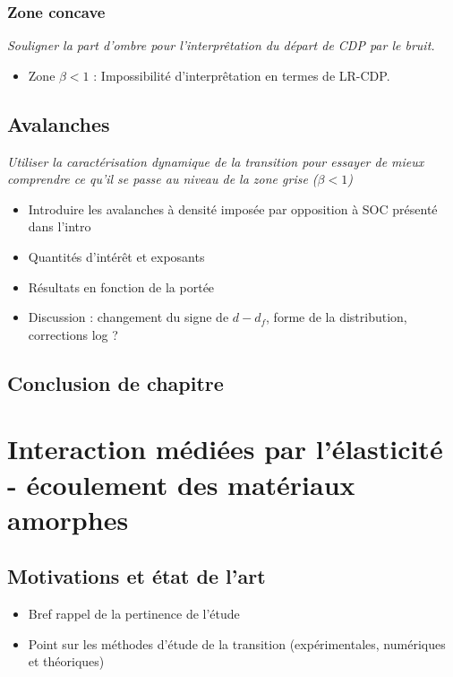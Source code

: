 \documentclass[10pt,a4paper]{article}
\begin{document}
\subsubsection{Zone concave}

\textit{Souligner la part d'ombre pour l'interprêtation du départ de CDP par le bruit.}

\begin{itemize}
	\item Zone $\beta<1$ : Impossibilité d'interprêtation en termes de LR-CDP.
\end{itemize}

\subsection{Avalanches}

\textit{Utiliser la caractérisation dynamique de la transition pour essayer de mieux comprendre ce qu'il se passe au niveau de la zone grise ($\beta<1$)}

\begin{itemize}
	\item Introduire les avalanches à densité imposée par opposition à SOC présenté dans l'intro
	\item Quantités d'intérêt et exposants
	\item Résultats en fonction de la portée
	\item Discussion : changement du signe de $d-d_f$, forme de la distribution, corrections log ?
\end{itemize}

\subsection{Conclusion de chapitre}

\section{Interaction médiées par l'élasticité - écoulement des matériaux amorphes}

\subsection{Motivations et état de l'art}

\begin{itemize}
	\item Bref rappel de la pertinence de l'étude 
	\item Point sur les méthodes d'étude de la transition (expérimentales, numériques et théoriques)
\end{itemize}
\end{document}

